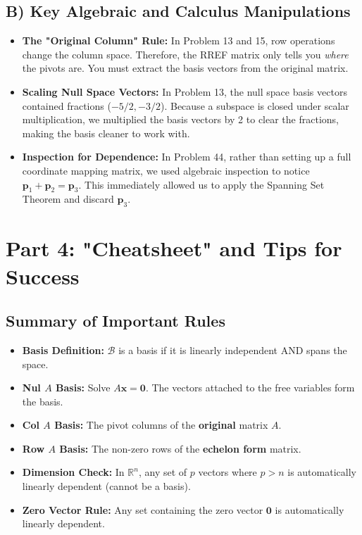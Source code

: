 \documentclass[12pt]{article}
\begin{document}
\subsection{B) Key Algebraic and Calculus Manipulations}
\begin{itemize}
    \item \textbf{The "Original Column" Rule:} In Problem 13 and 15, row operations change the column space. Therefore, the RREF matrix only tells you \textit{where} the pivots are. You must extract the basis vectors from the original matrix.
    \item \textbf{Scaling Null Space Vectors:} In Problem 13, the null space basis vectors contained fractions ($-5/2, -3/2$). Because a subspace is closed under scalar multiplication, we multiplied the basis vectors by 2 to clear the fractions, making the basis cleaner to work with.
    \item \textbf{Inspection for Dependence:} In Problem 44, rather than setting up a full coordinate mapping matrix, we used algebraic inspection to notice $\mathbf{p}_1 + \mathbf{p}_2 = \mathbf{p}_3$. This immediately allowed us to apply the Spanning Set Theorem and discard $\mathbf{p}_3$.
\end{itemize}

\newpage
\section{Part 4: "Cheatsheet" and Tips for Success}

\subsection{Summary of Important Rules}
\begin{itemize}
    \item \textbf{Basis Definition:} $\mathcal{B}$ is a basis if it is linearly independent AND spans the space.
    \item \textbf{Nul $A$ Basis:} Solve $A\mathbf{x} = \mathbf{0}$. The vectors attached to the free variables form the basis.
    \item \textbf{Col $A$ Basis:} The pivot columns of the \textbf{original} matrix $A$.
    \item \textbf{Row $A$ Basis:} The non-zero rows of the \textbf{echelon form} matrix.
    \item \textbf{Dimension Check:} In $\mathbb{R}^n$, any set of $p$ vectors where $p > n$ is automatically linearly dependent (cannot be a basis).
    \item \textbf{Zero Vector Rule:} Any set containing the zero vector $\mathbf{0}$ is automatically linearly dependent.
\end{itemize}
\end{document}
